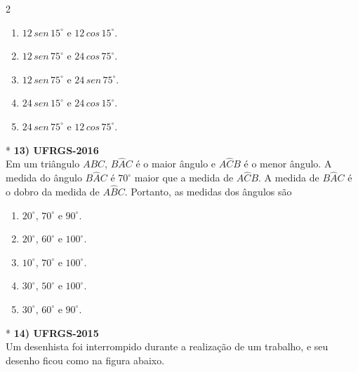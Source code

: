\documentclass[11pt,a4paper]{article}
\begin{document}
\begin{paracol}{2}
    \begin{enumerate}[label=(\Alph*), itemsep=0.2cm]
        \item $12\, sen\, 15^\circ$ e $12\, cos\, 15^\circ$.
        \item $12\, sen\, 75^\circ$ e $24\, cos\, 75^\circ$.
        \item $12\, sen\, 75^\circ$ e $24\, sen\, 75^\circ$.
        \item $24\, sen\, 15^\circ$ e $24\, cos\, 15^\circ$.
        \item $24\, sen\, 75^\circ$ e $12\, cos\, 75^\circ$.
    \end{enumerate}
    \vspace{0.4cm}

    \switchcolumn[1]
    \vspace{8.5cm}

    \switchcolumn[0]*
    \textbf{13) UFRGS-2016} \\
    Em um triângulo $ABC$, $B\hat{A}C$ é o maior ângulo e $A\hat{C}B$ é o menor ângulo. A medida do ângulo $B\hat{A}C$ é $70^\circ$ maior que a medida de $A\hat{C}B$. A medida de $B\hat{A}C$ é o dobro da medida de $A\hat{B}C$. Portanto, as medidas dos ângulos são

    \begin{enumerate}[label=(\Alph*), itemsep=0.2cm]
        \item $20^\circ$, $70^\circ$ e $90^\circ$.
        \item $20^\circ$, $60^\circ$ e $100^\circ$.
        \item $10^\circ$, $70^\circ$ e $100^\circ$.
        \item $30^\circ$, $50^\circ$ e $100^\circ$.
        \item $30^\circ$, $60^\circ$ e $90^\circ$.
    \end{enumerate}
    \vspace{0.4cm}

    \switchcolumn[1]
    \vspace{5cm}

    \switchcolumn[0]*
    \textbf{14) UFRGS-2015} \\
    Um desenhista foi interrompido durante a realização de um trabalho, e seu desenho ficou como na figura abaixo.

    \vspace{0.3cm}
    \begin{center}
\end{center}
\end{paracol}
\end{document}
